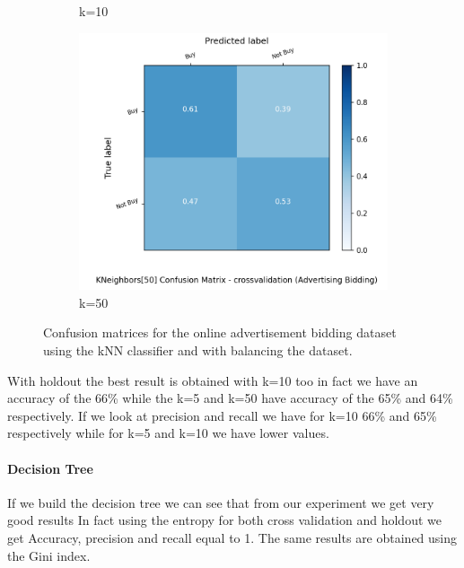 \documentclass{article}
\begin{document}
\begin{figure}[H]
\begin{subfigure}{.5\textwidth}
		\caption{k=10}
	\end{subfigure}
	\begin{subfigure}{.5\textwidth}
		\centering
		\includegraphics[width=1.1\textwidth]{Plots/conv_KNeighbors_50_balance_True_crossvalidation}
		\caption{k=50}
	\end{subfigure}
	\caption{Confusion matrices for the online advertisement bidding dataset using the kNN classifier and with balancing the dataset.}
\end{figure}


\noindent With holdout the best result is  obtained with  k=10 too in fact we have an accuracy of the 66\% while the k=5 and k=50 have accuracy of the 65\% and 64\% respectively.
If we look at precision and recall we have for k=10 66\% and 65\% respectively while for k=5 and k=10 we have lower values.


\paragraph{Decision Tree}
If we build the decision tree we can see that from our experiment we get very good results
In fact using the entropy for both cross validation and holdout we get Accuracy, precision and recall equal to 1.
The same results are obtained using the Gini index.
\end{document}

